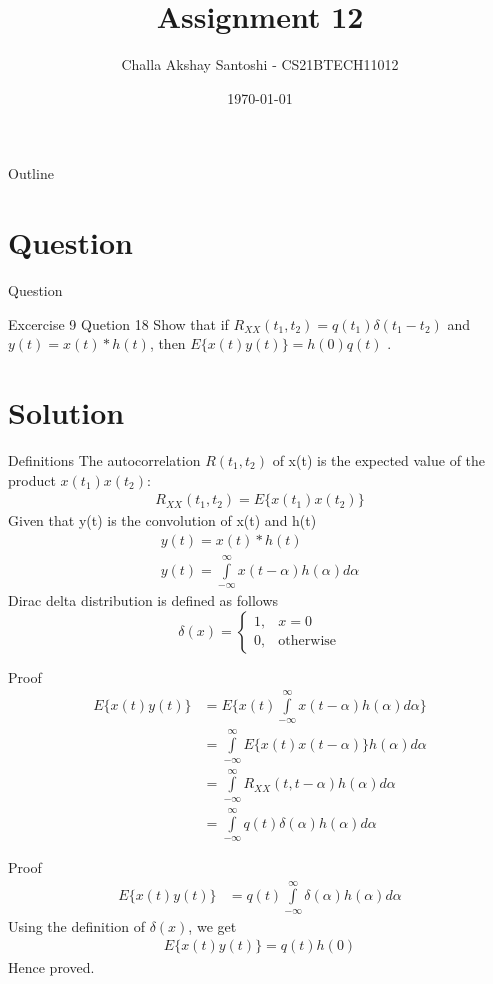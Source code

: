 \documentclass{beamer}
\title{Assignment 12}
\author{Challa Akshay Santoshi - CS21BTECH11012}
\date{\today}
\begin{document}
\begin{frame}
    \titlepage 
\end{frame}

\logo{}


\begin{frame}{Outline}
    \tableofcontents
\end{frame}


\section{Question}
\begin{frame}{Question}
\begin{block}{Excercise 9 Quetion 18} Show that if $R_{XX}(t_1,t_2) = q(t_1)\delta (t_1-t_2)$ and $y(t) = x(t)\ast h(t)$, then $E\{x(t)y(t)\} = h(0)q(t)$ .
    \end{block}
\end{frame}

\section{Solution}
\begin{frame}{Definitions}
The autocorrelation $R(t_1,t_2)$ of x(t) is the expected value of the product $x(t_1)x(t_2)$:
\begin{align}
    R_{XX} (t_1, t_2) = E\{x(t_1)x(t_2)\}
\end{align}
Given that y(t) is the convolution of x(t) and h(t)
\begin{align}
    y(t) = x(t)\ast h(t)\\
    y(t) = \int\limits_{-\infty}^\infty x(t-\alpha) h(\alpha) d\alpha
\end{align}
Dirac delta distribution is defined as follows
\begin{equation}
    \delta(x) = 
\begin{cases}
1, & x = 0 \\
0, & \text{otherwise} 
\end{cases}
\end{equation}
\end{frame}

\begin{frame}{Proof}
\begin{align}
    E\{x(t)y(t)\} &= E\{x(t)\int\limits_{-\infty}^\infty x(t-\alpha) h(\alpha) d\alpha\} \\
    &= \int\limits_{-\infty}^\infty E\{x(t)x(t - \alpha)\} h(\alpha) d\alpha\\
    &= \int\limits_{-\infty}^\infty R_{XX} (t, t - \alpha) h(\alpha) d\alpha\\
    &= \int\limits_{-\infty}^\infty q(t) \delta (\alpha) h(\alpha) d\alpha
\end{align}
\end{frame}

\begin{frame}{Proof}
\begin{align}
    E\{x(t)y(t)\} &= q(t) \int\limits_{-\infty}^\infty \delta (\alpha) h(\alpha) d\alpha
\end{align}
Using the definition of $\delta(x)$, we get
\begin{align}
    E\{x(t)y(t)\} = q(t) h(0)
\end{align}
Hence proved.
\end{frame}
\end{document}
